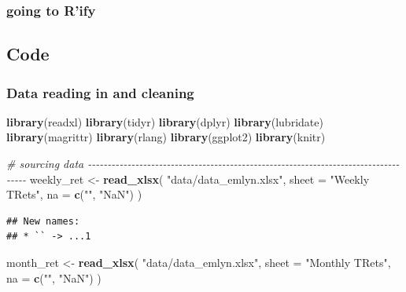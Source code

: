 \documentclass[
]{article}
\newenvironment{Shaded}{\begin{snugshade}}{\end{snugshade}}
\newcommand{\CommentTok}[1]{\textcolor[rgb]{0.56,0.35,0.01}{\textit{#1}}}
\newcommand{\DataTypeTok}[1]{\textcolor[rgb]{0.13,0.29,0.53}{#1}}
\newcommand{\KeywordTok}[1]{\textcolor[rgb]{0.13,0.29,0.53}{\textbf{#1}}}
\newcommand{\NormalTok}[1]{#1}
\newcommand{\StringTok}[1]{\textcolor[rgb]{0.31,0.60,0.02}{#1}}
\begin{document}
\hypertarget{going-to-rify}{%
\subsubsection{going to R'ify}\label{going-to-rify}}

\hypertarget{code}{%
\subsection{Code}\label{code}}

\hypertarget{data-reading-in-and-cleaning}{%
\subsubsection{Data reading in and cleaning}\label{data-reading-in-and-cleaning}}

\begin{Shaded}
\begin{Highlighting}[]
\KeywordTok{library}\NormalTok{(readxl)}
\KeywordTok{library}\NormalTok{(tidyr)}
\KeywordTok{library}\NormalTok{(dplyr)}
\KeywordTok{library}\NormalTok{(lubridate)}
\KeywordTok{library}\NormalTok{(magrittr)}
\KeywordTok{library}\NormalTok{(rlang)}
\KeywordTok{library}\NormalTok{(ggplot2)}
\KeywordTok{library}\NormalTok{(knitr)}

\CommentTok{\# sourcing data {-}{-}{-}{-}{-}{-}{-}{-}{-}{-}{-}{-}{-}{-}{-}{-}{-}{-}{-}{-}{-}{-}{-}{-}{-}{-}{-}{-}{-}{-}{-}{-}{-}{-}{-}{-}{-}{-}{-}{-}{-}{-}{-}{-}{-}{-}{-}{-}{-}{-}{-}{-}{-}{-}{-}{-}{-}{-}{-}{-}{-}{-}{-}{-}{-}{-}{-}{-}{-}{-}{-}{-}{-}{-}{-}{-}{-}{-}{-}{-}{-}{-}{-}{-}}
\NormalTok{weekly\_ret \textless{}{-}}\StringTok{ }\KeywordTok{read\_xlsx}\NormalTok{(}
  \StringTok{"data/data\_emlyn.xlsx"}\NormalTok{,}
  \DataTypeTok{sheet =} \StringTok{"Weekly TRets"}\NormalTok{,}
  \DataTypeTok{na =} \KeywordTok{c}\NormalTok{(}\StringTok{""}\NormalTok{, }\StringTok{"NaN"}\NormalTok{)}
\NormalTok{)}
\end{Highlighting}
\end{Shaded}

\begin{verbatim}
## New names:
## * `` -> ...1
\end{verbatim}

\begin{Shaded}
\begin{Highlighting}[]
\NormalTok{month\_ret \textless{}{-}}\StringTok{ }\KeywordTok{read\_xlsx}\NormalTok{(}
  \StringTok{"data/data\_emlyn.xlsx"}\NormalTok{,}
  \DataTypeTok{sheet =} \StringTok{"Monthly TRets"}\NormalTok{,}
  \DataTypeTok{na =} \KeywordTok{c}\NormalTok{(}\StringTok{""}\NormalTok{, }\StringTok{"NaN"}\NormalTok{)}
\NormalTok{)}
\end{Highlighting}
\end{Shaded}
\end{document}
